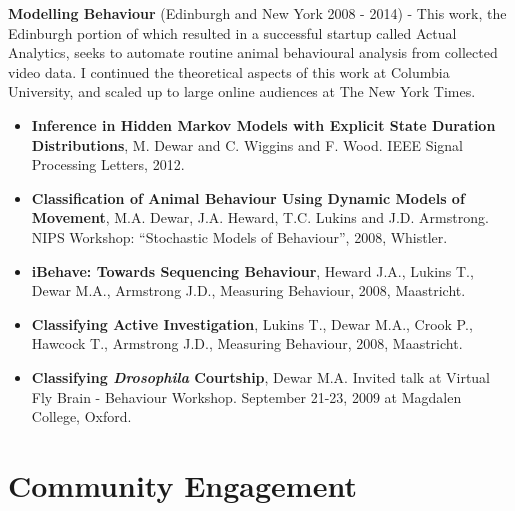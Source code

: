 \documentclass{res}
\begin{document}
\begin{resume}
\textbf{Modelling Behaviour} (Edinburgh and New York 2008 - 2014) - This work, the Edinburgh portion of which resulted in a successful startup called Actual Analytics, seeks to automate routine animal behavioural analysis from collected video data. I continued the theoretical aspects of this work at Columbia University, and scaled up to large online audiences at The New York Times.
    \begin{itemize}
        \item {\bf Inference in Hidden {M}arkov Models with Explicit State Duration Distributions}, M. Dewar and C. Wiggins and F. Wood. IEEE Signal Processing Letters, 2012.
        \item {\bf Classification of Animal Behaviour Using Dynamic Models of Movement},     M.A. Dewar, J.A. Heward, T.C. Lukins and J.D. Armstrong. NIPS Workshop: ``Stochastic Models of Behaviour'', 2008, Whistler. 
        \item {\bf iBehave: Towards Sequencing Behaviour}, Heward J.A., Lukins T., Dewar M.A., Armstrong J.D., Measuring Behaviour, 2008, Maastricht.
        \item {\bf Classifying Active Investigation}, Lukins T., Dewar M.A., Crook P., Hawcock T., Armstrong J.D., Measuring Behaviour, 2008, Maastricht.
	\item {\bf Classifying \emph{Drosophila} Courtship}, Dewar M.A. Invited talk at Virtual Fly Brain - Behaviour Workshop. September 21-23, 2009 at Magdalen College, Oxford.
    \end{itemize}

\section{Community Engagement}


\end{resume}
\end{document}
